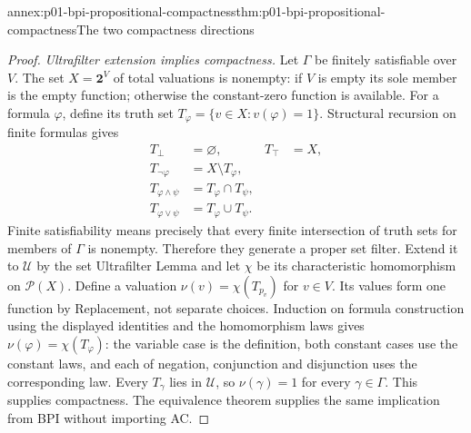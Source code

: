 \begin{annexitem}{annex:p01-bpi-propositional-compactness}{thm:p01-bpi-propositional-compactness}{The two compactness directions}
\begin{proof}
\emph{Ultrafilter extension implies compactness.} Let
\(\Gamma\) be finitely satisfiable over \(V\). The set
\(X=\mathbf2^V\) of total valuations is nonempty: if \(V\) is empty
its sole member is the empty function; otherwise the constant-zero
function is available. For a formula \(\varphi\), define its truth set
\(T_\varphi=\{v\in X:v(\varphi)=1\}\).
Structural recursion on finite formulas gives
\[
\begin{aligned}
 T_\bot&=\varnothing,& T_\top&=X,\\
 T_{\neg\varphi}&=X\setminus T_\varphi,&&\\
 T_{\varphi\land\psi}&=T_\varphi\cap T_\psi,&&\\
 T_{\varphi\lor\psi}&=T_\varphi\cup T_\psi.&&
\end{aligned}
\]
Finite satisfiability means precisely that every finite intersection of
truth sets for members of \(\Gamma\) is nonempty. Therefore they
generate a proper set filter. Extend it to \(\mathcal U\) by the
set Ultrafilter Lemma and let \(\chi\) be its characteristic
homomorphism on \(\mathcal P(X)\). Define a valuation
\(\nu(v)=\chi(T_{p_v})\) for \(v\in V\). Its values form one
function by Replacement, not separate choices. Induction on formula
construction using the displayed identities and the homomorphism laws
gives \(\nu(\varphi)=\chi(T_\varphi)\): the variable case is the
definition, both constant cases use the constant laws, and each of
negation, conjunction and disjunction uses the corresponding law.
Every \(T_\gamma\) lies in \(\mathcal U\), so
\(\nu(\gamma)=1\) for every \(\gamma\in\Gamma\). This supplies
compactness. The equivalence theorem supplies the same implication
from BPI without importing AC.


\end{proof}
\end{annexitem}

